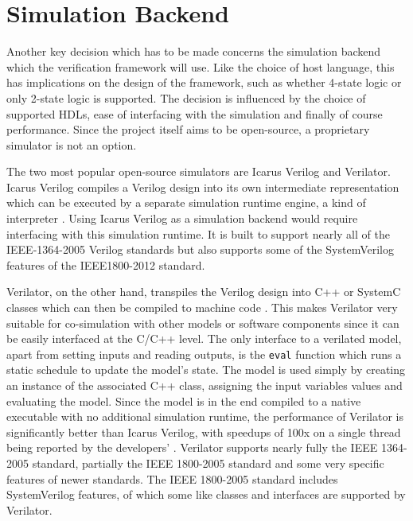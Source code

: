 \section{Simulation Backend} %

Another key decision which has to be made concerns the simulation backend which the verification framework will use.
Like the choice of host language, this has implications on the design of the framework, such as whether 4-state logic
or only 2-state logic is supported.
The decision is influenced by the choice of supported HDLs, ease of interfacing with the simulation and
finally of course performance. Since the project itself aims to be open-source, a proprietary simulator
is not an option.

The two most popular open-source simulators are Icarus Verilog and Verilator. Icarus Verilog
compiles a Verilog design into its own intermediate representation which can be executed by a separate simulation
runtime engine, a kind of interpreter \cite{iverilog}. Using Icarus Verilog as a simulation backend would require
interfacing with this simulation runtime. It is built to support nearly all of the IEEE-1364-2005 Verilog standards
but also supports some of the SystemVerilog features of the IEEE1800-2012 standard.

Verilator, on the other hand, transpiles the Verilog design into C++ or SystemC classes which can then be compiled
to machine code \cite{verilator}. This makes Verilator very suitable for co-simulation with other models
or software components since it can be easily interfaced at the C/C++ level. The only interface to a verilated
model, apart from setting inputs and reading outputs, is the \texttt{eval} function which runs a static schedule to
update the model's state. The model is used simply by creating an instance of the associated C++ class, assigning the
input variables values and evaluating the model. Since the model is in the end compiled to a native executable with
no additional simulation
runtime, the performance of Verilator is significantly better than Icarus Verilog, with speedups of 100x on a single
thread being reported by the developers' \cite{verilator}. Verilator supports nearly fully the IEEE 1364-2005
standard, partially the IEEE 1800-2005 standard and some very specific features of newer standards. The IEEE
1800-2005 standard includes SystemVerilog features, of which some like classes and interfaces are supported by Verilator.

